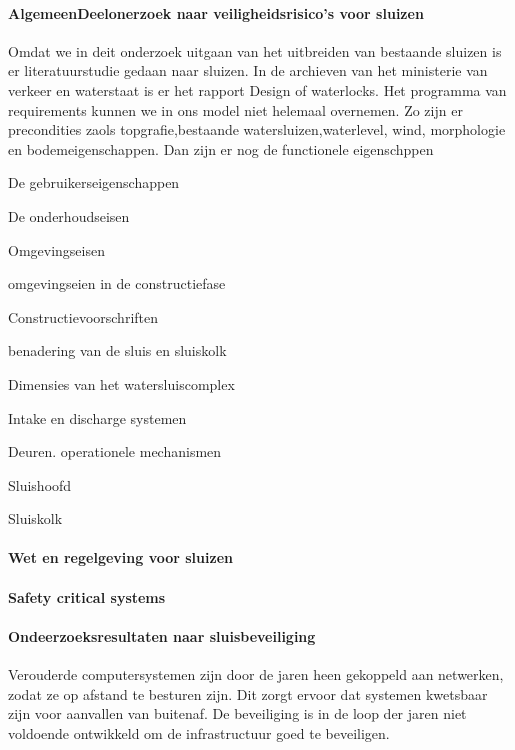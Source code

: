 \paragraph{AlgemeenDeelonerzoek naar veiligheidsrisico's voor sluizen}
Omdat we in deit onderzoek uitgaan van het uitbreiden van bestaande sluizen is er literatuurstudie gedaan naar sluizen. In de archieven van het ministerie van verkeer en waterstaat is er het rapport Design of waterlocks\cite{CivilEngineeringDivision}.
Het programma van requirements kunnen we in ons model niet helemaal overnemen. 
Zo zijn er precondities zaols topgrafie,bestaande watersluizen,waterlevel, wind, morphologie en bodemeigenschappen.
Dan zijn er nog de functionele eigenschppen


De gebruikerseigenschappen

De onderhoudseisen

Omgevingseisen

omgevingseien in de constructiefase

Constructievoorschriften

benadering van de sluis en sluiskolk

Dimensies van het watersluiscomplex


Intake en discharge systemen

Deuren. operationele mechanismen



Sluishoofd


Sluiskolk

\paragraph{Wet en regelgeving voor sluizen}
\paragraph{Safety critical systems}
\paragraph{Ondeerzoeksresultaten naar sluisbeveiliging}



Verouderde computersystemen zijn door de jaren heen gekoppeld aan netwerken, zodat ze op afstand te besturen zijn. Dit zorgt ervoor dat systemen kwetsbaar zijn voor aanvallen van buitenaf. De beveiliging is in de loop der jaren niet voldoende ontwikkeld om de infrastructuur goed te beveiligen.

